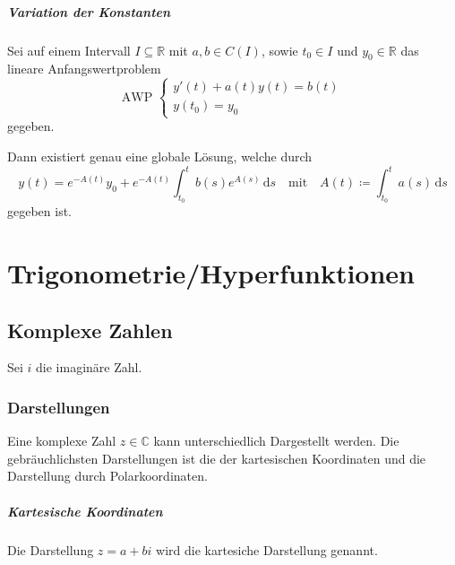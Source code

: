 			\paragraph{Variation der Konstanten}
				Sei auf einem Intervall $ I \subseteq \mathbb{R} $ mit $ a, b \in C(I) $, sowie $ t _ 0 \in I $ und $ y _ 0 \in \mathbb{R} $ das lineare Anfangswertproblem
				\begin{equation*}
					\text{AWP }
					\begin{cases}
						y'(t) + a(t)y(t) = b(t) \\
						y(t _ 0) = y _ 0
					\end{cases}
				\end{equation*}
				gegeben.

				Dann existiert genau eine globale Lösung, welche durch
				\begin{equation*}
					y(t) = e ^ { -A(t) } y _ 0 + e ^ { -A(t) } \int _ { t _ 0 } ^ t \! b(s) e ^ { A(s) } \, \mathrm{d}s \quad\text{mit}\quad A(t) \coloneqq \int _ { t _ 0 } ^ t \! a(s) \, \mathrm{d}s
				\end{equation*}
				gegeben ist.

			\paragraph{}

	\chapter{Trigonometrie/Hyperfunktionen}
		\section{Komplexe Zahlen}
			Sei $ i $ die imaginäre Zahl.

			\subsection{Darstellungen}
				Eine komplexe Zahl $ z \in \mathbb{C} $ kann unterschiedlich Dargestellt werden. Die gebräuchlichsten Darstellungen ist die der kartesischen Koordinaten und die Darstellung durch Polarkoordinaten.

				\paragraph{Kartesische Koordinaten}
					Die Darstellung $ z = a + bi $ wird die kartesiche Darstellung genannt.


